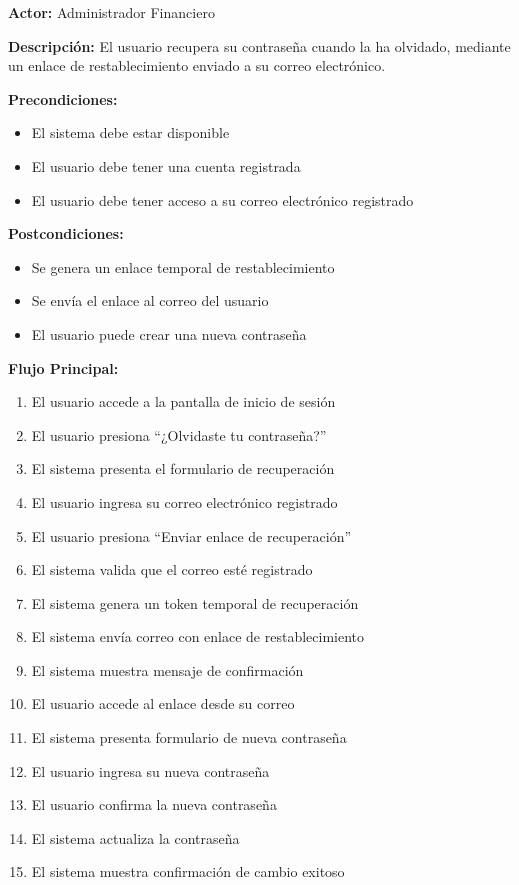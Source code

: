 \noindent\textbf{Actor:} Administrador Financiero

\noindent\textbf{Descripción:} El usuario recupera su contraseña cuando la ha olvidado, mediante un enlace de restablecimiento enviado a su correo electrónico.

\noindent\textbf{Precondiciones:}
\begin{itemize}
    \item El sistema debe estar disponible
    \item El usuario debe tener una cuenta registrada
    \item El usuario debe tener acceso a su correo electrónico registrado
\end{itemize}

\noindent\textbf{Postcondiciones:}
\begin{itemize}
    \item Se genera un enlace temporal de restablecimiento
    \item Se envía el enlace al correo del usuario
    \item El usuario puede crear una nueva contraseña
\end{itemize}

\noindent\textbf{Flujo Principal:}
\begin{enumerate}
    \item El usuario accede a la pantalla de inicio de sesión
    \item El usuario presiona ``¿Olvidaste tu contraseña?''
    \item El sistema presenta el formulario de recuperación
    \item El usuario ingresa su correo electrónico registrado
    \item El usuario presiona ``Enviar enlace de recuperación''
    \item El sistema valida que el correo esté registrado
    \item El sistema genera un token temporal de recuperación
    \item El sistema envía correo con enlace de restablecimiento
    \item El sistema muestra mensaje de confirmación
    \item El usuario accede al enlace desde su correo
    \item El sistema presenta formulario de nueva contraseña
    \item El usuario ingresa su nueva contraseña
    \item El usuario confirma la nueva contraseña
    \item El sistema actualiza la contraseña
    \item El sistema muestra confirmación de cambio exitoso
\end{enumerate}

